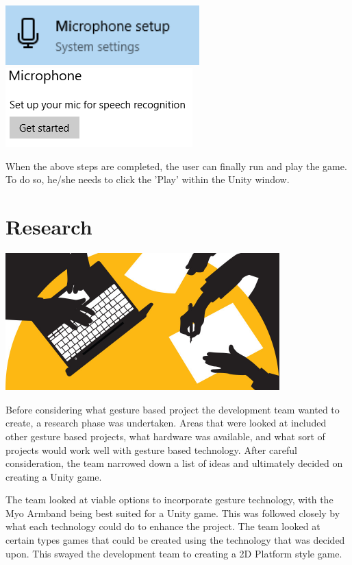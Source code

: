 \documentclass{article}
\begin{document}
\includegraphics[height=65pt]{img/microphoneSetup.PNG}
\includegraphics[]{img/micGetstarterd.PNG}
\bigskip

When the above steps are completed, the user can finally run and play the game. To do so, he/she needs to click the 'Play' within the Unity window.
\section{Research}
\includegraphics[width=\textwidth, height=150pt]{img/Research.jpg}
\bigskip

Before considering what gesture based project the development team wanted to create, a research phase was undertaken. Areas that were looked at included other gesture based projects, what hardware was available, and what sort of projects would work well with gesture based technology. After careful consideration, the team narrowed down a list of ideas and ultimately decided on creating a Unity game.

\bigskip

The team looked at viable options to incorporate gesture technology, with the Myo Armband being best suited for a Unity game. This was followed closely by what each technology could do to enhance the project. The team looked at certain types games that could be created using the technology that was decided upon. This swayed the development team to creating a 2D Platform style game.
\end{document}
